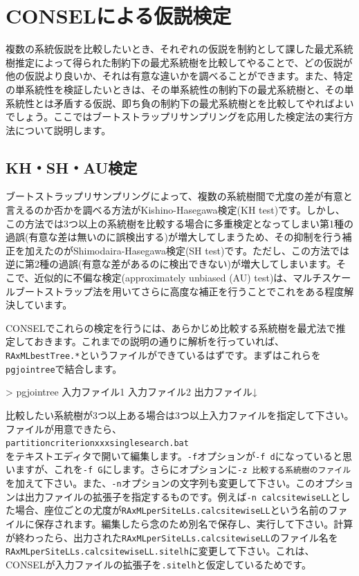 \documentclass[titlepage,10pt,a4paper]{jsbook}
\newenvironment{cmd}{\begin{oframed}\raggedright\ttfamily\footnotesize\setlength{\baselineskip}{1.4em}}{\end{oframed}\vspace{-1em}}
\begin{document}
\section{CONSELによる仮説検定}

複数の系統仮説を比較したいとき、それぞれの仮説を制約として課した最尤系統樹推定によって得られた制約下の最尤系統樹を比較してやることで、どの仮説が他の仮説より良いか、それは有意な違いかを調べることができます。また、特定の単系統性を検証したいときは、その単系統性の制約下の最尤系統樹と、その単系統性とは矛盾する仮説、即ち負の制約下の最尤系統樹とを比較してやればよいでしょう。ここではブートストラップリサンプリングを応用した検定法の実行方法について説明します。

\subsection{KH・SH・AU検定}

ブートストラップリサンプリングによって、複数の系統樹間で尤度の差が有意と言えるのか否かを調べる方法がKishino-Hasegawa検定(KH test)です\citep{Kishino1989}。しかし、この方法では3つ以上の系統樹を比較する場合に多重検定となってしまい第1種の過誤(有意な差は無いのに誤検出する)が増大してしまうため、その抑制を行う補正を加えたのがShimodaira-Hasegawa検定(SH test)です\citep{Shimodaira1999}。ただし、この方法では逆に第2種の過誤(有意な差があるのに検出できない)が増大してしまいます。そこで、近似的に不偏な検定(approximately unbiased (AU) test)は、マルチスケールブートストラップ法を用いてさらに高度な補正を行うことでこれをある程度解決しています\citep{Shimodaira2002}。

CONSELでこれらの検定を行うには、あらかじめ比較する系統樹を最尤法で推定しておきます。これまでの説明の通りに解析を行っていれば、\texttt{RAxML{\textunderscore}bestTree.*}というファイルができているはずです。まずはこれらを\texttt{pgjointree}で結合します。
\begin{cmd}
{\textgreater} pgjointree 入力ファイル1 入力ファイル2 出力ファイル↓
\end{cmd}
比較したい系統樹が3つ以上ある場合は3つ以上入力ファイルを指定して下さい。ファイルが用意できたら、\\
\texttt{partition{\textunderscore}criterion{\textunderscore}xxx{\textunderscore}singlesearch.bat}\\
をテキストエディタで開いて編集します。\texttt{-f}オプションが\texttt{-f d}になっていると思いますが、これを\texttt{-f G}にします。さらにオプションに\texttt{-z 比較する系統樹のファイル}を加えて下さい。また、\texttt{-n}オプションの文字列も変更して下さい。このオプションは出力ファイルの拡張子を指定するものです。例えば\texttt{-n calcsitewiseLL}とした場合、座位ごとの尤度が\texttt{RAxML{\textunderscore}perSiteLLs.calcsitewiseLL}という名前のファイルに保存されます。編集したら念のため別名で保存し、実行して下さい。計算が終わったら、出力された\texttt{RAxML{\textunderscore}perSiteLLs.calcsitewiseLL}のファイル名を\texttt{RAxML{\textunderscore}perSiteLLs.calcsitewiseLL.sitelh}に変更して下さい。これは、CONSELが入力ファイルの拡張子を\texttt{.sitelh}と仮定しているためです。
\end{document}
